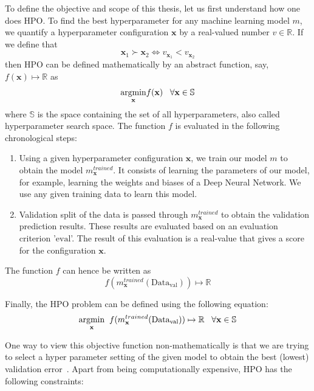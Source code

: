 \documentclass[12pt, twoside, ngerman]{report}
\begin{document}
To define the objective and scope of this thesis, let us first understand how one does HPO.
To find the best hyperparameter for any machine learning model $m$, we quantify a hyperparameter configuration $\textbf{x}$ by a real-valued number $v \in \mathbb{R}$. If we define that
$$
\textbf{x}_1 \succ  \textbf{x}_2 \iff v_{\textbf{x}_1} < v_{\textbf{x}_2}
$$
then HPO can be defined mathematically by an abstract function, say,  $f(\textbf{x}) \mapsto \mathbb{R}$ as
$$
     \underset{\rm \textbf{x}}{\rm argmin}  f(\textbf{x}) \;\;\;  \forall \textbf{x} \in \mathbb{S}
$$
where $\mathbb{S}$ is the space containing the set of all hyperparameters, also called hyperparameter search space.
The function $f$ is evaluated in the following chronological steps:
\begin{enumerate}
\item Using a given hyperparameter configuration $\textbf{x}$,  we train our model $m$ to obtain the model $m^{trained}_\textbf{x}$. It consists of learning the parameters of our model, for example, learning the weights and biases of a Deep Neural Network. We use any given training data to learn this model.
\item Validation split of the data is passed through $m^{trained}_\textbf{x}$ to obtain the validation prediction results. These results are evaluated based on an evaluation criterion '$\textrm{eval}$'. The result of this evaluation is a real-value that gives a score for the configuration $\textbf{x}$.
\end{enumerate}

The function $f$ can hence be written as 
$$
f(m^{trained}_\textbf{x} (\textrm{Data}_\textrm{val})) \mapsto \mathbb{R}
$$

Finally, the HPO problem can be defined using the following equation:
\begin{equation}
\label{eq:hpoobjectivefunc}
\underset{\rm \textbf{x}}{\rm argmin} \;\; f(m^{trained}_\textbf{x} (\textrm{Data}_\textrm{val})) \mapsto \mathbb{R}   \;\;\;  \forall \textbf{x} \in \mathbb{S}
\end{equation}

\label{sec:hpoConstraints}

One way to view this objective function non-mathematically is that we are trying to select a hyper parameter setting of the given model to obtain the best (lowest) validation error~\cite{fsbopaper}.  Apart from being computationally expensive,  HPO has the following constraints:
\end{document}

